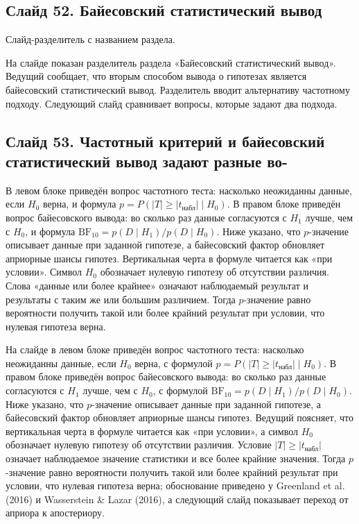 \documentclass[11pt,a4paper]{article}
\begin{document}
\subsection*{Слайд 52. Байесовский статистический вывод}
\begin{onslide}
Слайд-разделитель с названием раздела.
\end{onslide}
На слайде показан разделитель раздела «Байесовский статистический вывод». Ведущий сообщает, что вторым способом вывода о гипотезах является байесовский статистический вывод. Разделитель вводит альтернативу частотному подходу. Следующий слайд сравнивает вопросы, которые задают два подхода.

\subsection*{Слайд 53. Частотный критерий и байесовский статистический вывод задают разные во-}
\begin{onslide}
В левом блоке приведён вопрос частотного теста: насколько неожиданны данные, если $H_0$ верна, и формула $p = P(|T| \ge |t_{\text{набл}}| \mid H_0)$. В правом блоке приведён вопрос байесовского вывода: во сколько раз данные согласуются с $H_1$ лучше, чем с $H_0$, и формула $\mathrm{BF}_{10} = p(D\mid H_1)/p(D\mid H_0)$. Ниже указано, что $p$-значение описывает данные при заданной гипотезе, а байесовский фактор обновляет априорные шансы гипотез. Вертикальная черта в формуле читается как «при условии». Символ $H_0$ обозначает нулевую гипотезу об отсутствии различия. Слова «данные или более крайнее» означают наблюдаемый результат и результаты с таким же или большим различием. Тогда $p$-значение равно вероятности получить такой или более крайний результат при условии, что нулевая гипотеза верна.
\end{onslide}
На слайде в левом блоке приведён вопрос частотного теста: насколько неожиданны данные, если $H_0$ верна, с формулой $p = P(|T| \ge |t_{\text{набл}}| \mid H_0)$. В правом блоке приведён вопрос байесовского вывода: во сколько раз данные согласуются с $H_1$ лучше, чем с $H_0$, с формулой $\mathrm{BF}_{10} = p(D\mid H_1)/p(D\mid H_0)$. Ниже указано, что $p$-значение описывает данные при заданной гипотезе, а байесовский фактор обновляет априорные шансы гипотез. Ведущий поясняет, что вертикальная черта в формуле читается как «при условии», а символ $H_0$ обозначает нулевую гипотезу об отсутствии различия. Условие $|T| \ge |t_{\text{набл}}|$ означает наблюдаемое значение статистики и все более крайние значения. Тогда $p$-значение равно вероятности получить такой или более крайний результат при условии, что нулевая гипотеза верна; обоснование приведено у Greenland et al. (2016) и Wasserstein \& Lazar (2016), а следующий слайд показывает переход от априора к апостериору.
\end{document}
